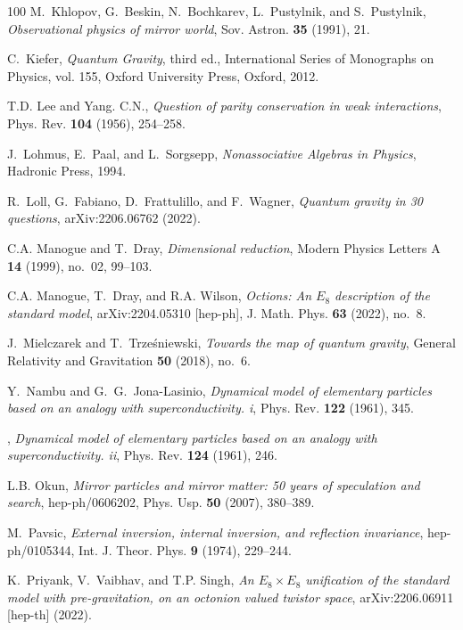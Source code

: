 \documentclass[reqno,11pt]{amsart}
\numberwithin{equation}{section}
\newcommand{\1}{\mbox{\rm 1 \hspace{-1.05 em} 1}}
\begin{document}
{\begin{thebibliography}{100}
M.~Khlopov, G.~Beskin, N.~Bochkarev, L.~Pustylnik, and S.~Pustylnik,
  \emph{Observational physics of mirror world}, Sov. Astron. \textbf{35}
  (1991), 21.

C.~Kiefer, \emph{Quantum {G}ravity}, third ed., International Series of
  Monographs on Physics, vol. 155, Oxford University Press, Oxford, 2012.

T.D. Lee and Yang. C.N., \emph{Question of parity conservation in weak
  interactions}, Phys. Rev. \textbf{104} (1956), 254--258.

J.~Lohmus, E.~Paal, and L.~Sorgsepp, \emph{Nonassociative {A}lgebras in
  {P}hysics}, Hadronic Press, 1994.

R.~Loll, G.~Fabiano, D.~Frattulillo, and F.~Wagner, \emph{Quantum gravity in 30
  questions}, arXiv:2206.06762 (2022).

C.A. Manogue and T.~Dray, \emph{Dimensional reduction}, Modern Physics Letters
  A \textbf{14} (1999), no.~02, 99--103.

C.A. Manogue, T.~Dray, and R.A. Wilson, \emph{Octions: An {$E_8$} description
  of the standard model}, arXiv:2204.05310 [hep-ph], J. Math. Phys. \textbf{63}
  (2022), no.~8.

J.~Mielczarek and T.~Trze{\'{s}}niewski, \emph{Towards the map of quantum
  gravity}, General Relativity and Gravitation \textbf{50} (2018), no.~6.

Y.~Nambu and G.~G.~Jona-Lasinio, \emph{Dynamical model of elementary particles
  based on an analogy with superconductivity. i}, Phys. Rev. \textbf{122}
  (1961), 345.

\bysame, \emph{Dynamical model of elementary particles based on an analogy with
  superconductivity. ii}, Phys. Rev. \textbf{124} (1961), 246.

L.B. Okun, \emph{Mirror particles and mirror matter: 50 years of speculation
  and search}, hep-ph/0606202, Phys. Usp. \textbf{50} (2007), 380--389.

M.~Pavsic, \emph{External inversion, internal inversion, and reflection
  invariance}, hep-ph/0105344, Int. J. Theor. Phys. \textbf{9} (1974),
  229--244.

K.~Priyank, V.~Vaibhav, and T.P. Singh, \emph{An {$E_8 \times E_8$} unification
  of the standard model with pre-gravitation, on an octonion valued twistor
  space}, arXiv:2206.06911 [hep-th] (2022).


\end{thebibliography}}
\end{document}
